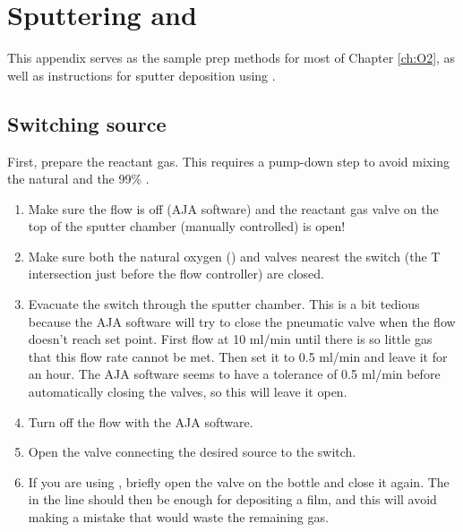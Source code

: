 \section{Sputtering  and }\label{app:sputter}

This appendix serves as the sample prep methods for most of Chapter \ref{ch:O2}, as well as instructions for sputter deposition using .

\subsection{Switching  source}
First, prepare the reactant gas. This requires a pump-down step to avoid mixing the natural  and the 99\% .
\begin{enumerate}
	\item Make sure the flow is off (AJA software) and the reactant gas valve on the top of the sputter chamber (manually controlled) is open!
	
	\item Make sure both the natural oxygen () and  valves nearest the switch (the T intersection just before the flow controller) are closed.
	
	\item Evacuate the switch through the sputter chamber. This is a bit tedious because the AJA software will try to close the pneumatic valve when the flow doesn't reach set point. First flow at 10 ml/min until there is so little gas that this flow rate cannot be met. Then set it to 0.5 ml/min and leave it for an hour. The AJA software seems to have a tolerance of 0.5 ml/min before automatically closing the valves, so this will leave it open.
	
	\item Turn off the flow with the AJA software.
	
	\item Open the valve connecting the desired  source to the switch. 
	
	\item If you are using , briefly open the valve on the bottle and close it again. The  in the line should then be enough for depositing a film, and this will avoid making a mistake that would waste the remaining gas.
\end{enumerate}


